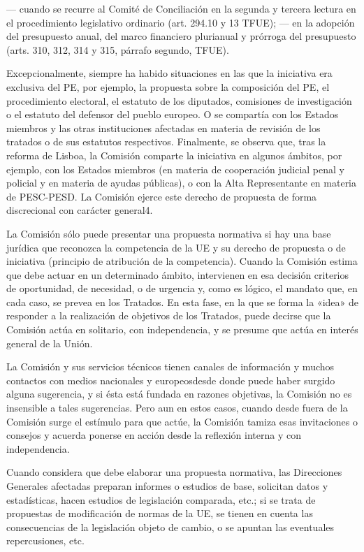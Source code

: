 \documentclass[10pt,a4paper]{article}
\begin{document}
— cuando se recurre al Comité de Conciliación en la segunda y tercera lectura en el procedimiento legislativo ordinario (art. 294.10 y 13 TFUE);
— en la adopción del presupuesto anual, del marco financiero plurianual y prórroga del presupuesto (arts. 310, 312, 314 y 315, párrafo segundo, TFUE). 

Excepcionalmente, siempre ha habido situaciones en las que la iniciativa era exclusiva del PE, por ejemplo, la propuesta sobre la composición del PE, el procedimiento electoral, el estatuto de los diputados, comisiones de investigación o el estatuto del defensor del pueblo europeo. O se compartía con los Estados miembros y las otras instituciones afectadas en materia de revisión de los tratados o de sus estatutos respectivos. Finalmente, se observa que, tras la reforma de Lisboa, la Comisión comparte la iniciativa en algunos ámbitos, por ejemplo, con los Estados miembros (en materia de cooperación judicial penal y policial y en materia de ayudas públicas), o con la Alta Representante en materia de PESC-PESD. La Comisión ejerce este derecho de propuesta de forma discrecional con carácter general4.


La Comisión sólo puede presentar una propuesta normativa si hay una base jurídica que reconozca la competencia de la UE y su derecho de propuesta o de iniciativa (principio de atribución de la competencia). Cuando la Comisión estima que debe actuar en un determinado ámbito, intervienen en esa decisión criterios de oportunidad, de necesidad, o de urgencia y, como es lógico, el mandato que, en cada caso, se prevea en los Tratados. En esta fase, en la que se forma la «idea» de responder a la realización de objetivos de los Tratados, puede decirse que la Comisión actúa en solitario, con independencia, y se presume que actúa en interés general de la Unión.

La Comisión y sus servicios técnicos tienen canales de información y muchos contactos con medios nacionales y europeosdesde donde puede haber surgido alguna sugerencia, y si ésta está fundada en razones objetivas, la Comisión no es insensible a tales sugerencias. Pero aun en estos casos, cuando desde fuera de la Comisión surge el estímulo para que actúe, la Comisión tamiza esas invitaciones o consejos y acuerda ponerse en acción desde la reflexión interna y con independencia.

Cuando considera que debe elaborar una propuesta normativa, las Direcciones Generales afectadas preparan informes o estudios de base, solicitan datos y estadísticas, hacen estudios de legislación comparada, etc.; si se trata de propuestas de modificación de normas de la UE, se tienen en cuenta las consecuencias de la legislación objeto de cambio, o se apuntan las eventuales repercusiones, etc.
\end{document}
